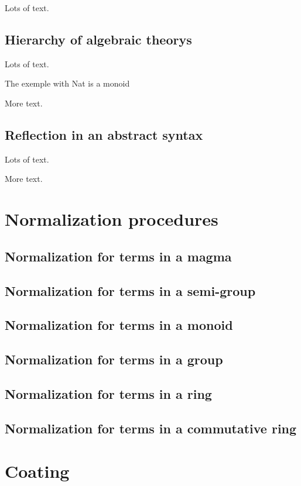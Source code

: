 \documentclass{sigplanconf}
\begin{document}
Lots of text.

\subsection{Hierarchy of algebraic theorys}

Lots of text.

The exemple with Nat is a monoid

More text.

\subsection{Reflection in an abstract syntax}

Lots of text.

More text. 

\section{Normalization procedures}

\subsection{Normalization for terms in a magma}

\subsection{Normalization for terms in a semi-group}

\subsection{Normalization for terms in a monoid}

\subsection{Normalization for terms in a group}

\subsection{Normalization for terms in a ring}

\subsection{Normalization for terms in a commutative ring}

\section{Coating}
\end{document}
